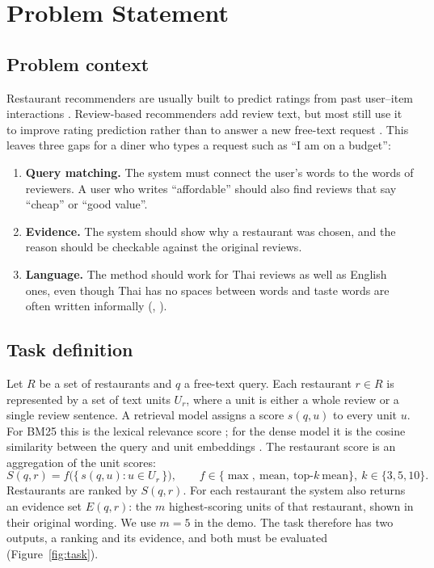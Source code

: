 \chapter{Problem Statement}
\label{ch:problem}

\section{Problem context}
Restaurant recommenders are usually built to predict ratings from past user--item
interactions \citep{koren2009matrix}. Review-based recommenders add review text, but most
still use it to improve rating prediction rather than to answer a new free-text request
\citep{hasan2025reviewsurvey}. This leaves three gaps for a diner who types a request such as
``I am on a budget'':
\begin{enumerate}
  \item \textbf{Query matching.} The system must connect the user's words to the words of
  reviewers. A user who writes ``affordable'' should also find reviews that say ``cheap'' or
  ``good value''.
  \item \textbf{Evidence.} The system should show why a restaurant was chosen, and the reason
  should be checkable against the original reviews.
  \item \textbf{Language.} The method should work for Thai reviews as well as English ones,
  even though Thai has no spaces between words and taste words are often written informally
  (, ).
\end{enumerate}

\section{Task definition}
Let $R$ be a set of restaurants and $q$ a free-text query. Each restaurant $r \in R$ is
represented by a set of text units $U_r$, where a unit is either a whole review or a single
review sentence. A retrieval model assigns a score $s(q,u)$ to every unit $u$. For BM25 this is
the lexical relevance score \citep{robertson2009bm25}; for the dense model it is the cosine
similarity between the query and unit embeddings \citep{reimers2019sbert}. The restaurant score
is an aggregation of the unit scores:
\begin{equation}
  S(q,r) = f\big(\{\, s(q,u) : u \in U_r \,\}\big),
  \qquad f \in \{\max,\ \mathrm{mean},\ \text{top-}k\ \mathrm{mean}\},\ k \in \{3,5,10\}.
  \label{eq:aggregation}
\end{equation}
Restaurants are ranked by $S(q,r)$. For each restaurant the system also returns an evidence set
$E(q,r)$: the $m$ highest-scoring units of that restaurant, shown in their original wording.
We use $m=5$ in the demo. The task therefore has two outputs, a ranking and its evidence, and
both must be evaluated (Figure~\ref{fig:task}).

